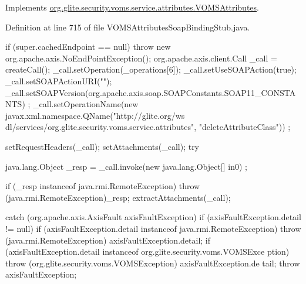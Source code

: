 Implements \hyperlink{interfaceorg_1_1glite_1_1security_1_1voms_1_1service_1_1attributes_1_1VOMSAttributes_a1e39cc4132d43da6354c8f7ea8bff77b}{org.glite.security.voms.service.attributes.VOMSAttributes}.



Definition at line 715 of file VOMSAttributesSoapBindingStub.java.


\begin{DoxyCode}
                                                                                 
                                                                                       
               {
        if (super.cachedEndpoint == null) {
            throw new org.apache.axis.NoEndPointException();
        }
        org.apache.axis.client.Call _call = createCall();
        _call.setOperation(_operations[6]);
        _call.setUseSOAPAction(true);
        _call.setSOAPActionURI("");
        _call.setSOAPVersion(org.apache.axis.soap.SOAPConstants.SOAP11_CONSTANTS)
      ;
        _call.setOperationName(new javax.xml.namespace.QName("http://glite.org/ws
      dl/services/org.glite.security.voms.service.attributes", "deleteAttributeClass"))
      ;

        setRequestHeaders(_call);
        setAttachments(_call);
 try {        java.lang.Object _resp = _call.invoke(new java.lang.Object[] {in0})
      ;

        if (_resp instanceof java.rmi.RemoteException) {
            throw (java.rmi.RemoteException)_resp;
        }
        extractAttachments(_call);
  } catch (org.apache.axis.AxisFault axisFaultException) {
    if (axisFaultException.detail != null) {
        if (axisFaultException.detail instanceof java.rmi.RemoteException) {
              throw (java.rmi.RemoteException) axisFaultException.detail;
         }
        if (axisFaultException.detail instanceof org.glite.security.voms.VOMSExce
      ption) {
              throw (org.glite.security.voms.VOMSException) axisFaultException.de
      tail;
         }
   }
  throw axisFaultException;
}
    }
\end{DoxyCode}
